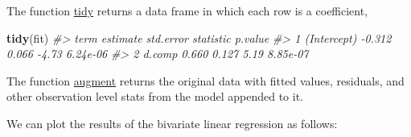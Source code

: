 \documentclass[]{book}
\newenvironment{Shaded}{\begin{snugshade}}{\end{snugshade}}
\newcommand{\CommentTok}[1]{\textcolor[rgb]{0.56,0.35,0.01}{\textit{#1}}}
\newcommand{\KeywordTok}[1]{\textcolor[rgb]{0.13,0.29,0.53}{\textbf{#1}}}
\newcommand{\NormalTok}[1]{#1}
\newcommand{\OperatorTok}[1]{\textcolor[rgb]{0.81,0.36,0.00}{\textbf{#1}}}
\newcommand{\StringTok}[1]{\textcolor[rgb]{0.31,0.60,0.02}{#1}}
\theoremstyle{definition}
\theoremstyle{definition}
\theoremstyle{definition}
\theoremstyle{remark}
\begin{document}
The function
\href{https://www.rdocumentation.org/packages/broom/topics/tidy.lm}{tidy}
returns a data frame in which each row is a coefficient,

\begin{Shaded}
\begin{Highlighting}[]
\KeywordTok{tidy}\NormalTok{(fit)}
\CommentTok{#>          term estimate std.error statistic  p.value}
\CommentTok{#> 1 (Intercept)   -0.312     0.066     -4.73 6.24e-06}
\CommentTok{#> 2      d.comp    0.660     0.127      5.19 8.85e-07}
\end{Highlighting}
\end{Shaded}

The function
\href{https://www.rdocumentation.org/packages/broom/topics/augment.lm}{augment}
returns the original data with fitted values, residuals, and other
observation level stats from the model appended to it.

\begin{Shaded}
\end{Shaded}

We can plot the results of the bivariate linear regression as follows:
\end{document}
